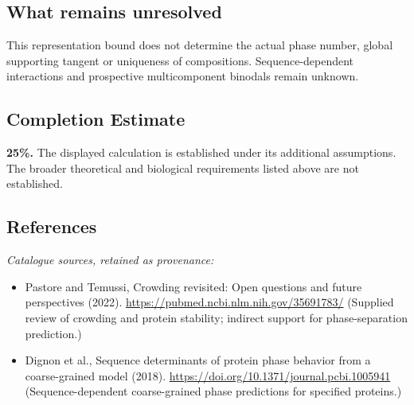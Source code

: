 \documentclass[11pt]{article}
\begin{document}
\subsection{What remains unresolved}
This representation bound does not determine the actual phase number, global supporting tangent or uniqueness of compositions. Sequence-dependent interactions and prospective multicomponent binodals remain unknown.
\subsection{Completion Estimate}
\textbf{25\%.} The displayed calculation is established under its additional assumptions. The broader theoretical and biological requirements listed above are not established.
\subsection{References}
\noindent\emph{Catalogue sources, retained as provenance:}
\begin{itemize}
\item Pastore and Temussi, Crowding revisited: Open questions and future perspectives (2022). \url{https://pubmed.ncbi.nlm.nih.gov/35691783/} (Supplied review of crowding and protein stability; indirect support for phase-separation prediction.)
\item Dignon et al., Sequence determinants of protein phase behavior from a coarse-grained model (2018). \url{https://doi.org/10.1371/journal.pcbi.1005941} (Sequence-dependent coarse-grained phase predictions for specified proteins.)
\end{itemize}
\clearpage


\appendix
\end{document}
